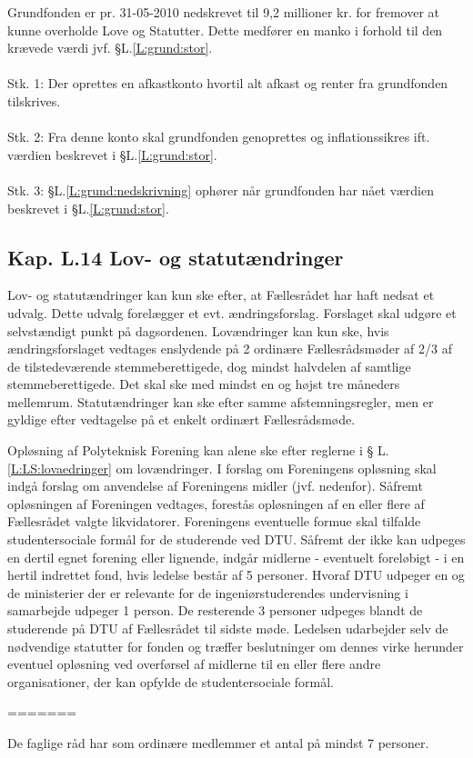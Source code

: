 \begin{list}
\item \label{L:grund:nedskrivning} Grundfonden er pr. 31-05-2010 nedskrevet til 9,2 millioner kr. for fremover at kunne overholde Love og
Statutter. Dette medfører en manko i forhold til den krævede værdi jvf. §L.\ref{L:grund:stor}.
\\
\\
Stk. 1: Der oprettes en afkastkonto hvortil alt afkast og renter fra grundfonden tilskrives.
\\
\\
Stk. 2: Fra denne konto skal grundfonden genoprettes og inflationssikres ift. værdien beskrevet i §L.\ref{L:grund:stor}.
\\
\\
Stk. 3: §L.\ref{L:grund:nedskrivning} ophører når grundfonden har nået værdien beskrevet i §L.\ref{L:grund:stor}.





\subsection{Kap. L.14 Lov- og statutændringer}
\item \label{L:LS:lovaedringer} Lov- og statutændringer kan kun ske efter, at Fællesrådet har haft nedsat et udvalg. Dette udvalg forelægger et evt. ændringsforslag. Forslaget skal udgøre et selvstændigt punkt på dagsordenen. Lovændringer kan kun ske, hvis ændringsforslaget vedtages enslydende på 2 ordinære Fællesrådsmøder af 2/3 af de tilstedeværende stemmeberettigede, dog mindst halvdelen af samtlige stemmeberettigede. Det skal ske med mindst en og højst tre måneders mellemrum. Statutændringer kan ske efter samme afstemningsregler, men er gyldige efter vedtagelse på et enkelt ordinært Fællesrådsmøde.

\item \label{L:LS:oploesning} Opløsning af Polyteknisk Forening kan alene ske efter reglerne i § L.\ref{L:LS:lovaedringer} om lovændringer. I forslag om Foreningens opløsning skal indgå forslag om anvendelse af Foreningens midler (jvf. nedenfor). Såfremt opløsningen af Foreningen vedtages, forestås opløsningen af en eller flere af Fællesrådet valgte likvidatorer. Foreningens eventuelle formue skal tilfalde studentersociale formål for de studerende ved DTU. Såfremt der ikke kan udpeges en dertil egnet forening eller lignende, indgår midlerne - eventuelt foreløbigt - i en hertil indrettet fond, hvis ledelse består af 5 personer. Hvoraf DTU udpeger en og de ministerier der er relevante for de ingeniørstuderendes undervisning i samarbejde udpeger 1 person. De resterende 3 personer udpeges blandt de studerende på DTU af Fællesrådet til sidste møde. Ledelsen udarbejder selv de nødvendige statutter for fonden og træffer beslutninger om dennes virke herunder eventuel opløsning ved overførsel af midlerne til en eller flere andre organisationer, der kan opfylde de studentersociale formål.

\end{list}
=======
\item De faglige råd har som ordinære medlemmer et antal på mindst 7 personer.\\

